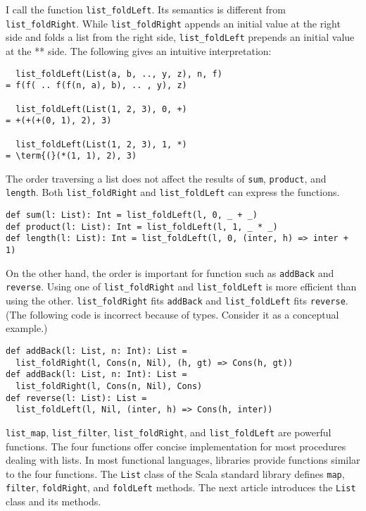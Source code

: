 I call the function \verb!list_foldLeft!. Its semantics is different from
\verb!list_foldRight!. While \verb!list_foldRight! appends an initial value at
the right side and folds a list from the right side, \verb!list_foldLeft!
prepends an initial value at the ** side. The following gives an intuitive
interpretation:

\begin{verbatim}
  list_foldLeft(List(a, b, .., y, z), n, f)
= f(f( .. f(f(n, a), b), .. , y), z)

  list_foldLeft(List(1, 2, 3), 0, +)
= +(+(+(0, 1), 2), 3)

  list_foldLeft(List(1, 2, 3), 1, *)
= \term{(}(*(1, 1), 2), 3)
\end{verbatim}

The order traversing a list does not affect the results of \verb!sum!,
\verb!product!, and \verb!length!. Both \verb!list_foldRight! and
\verb!list_foldLeft! can express the functions.

\begin{verbatim}
def sum(l: List): Int = list_foldLeft(l, 0, _ + _)
def product(l: List): Int = list_foldLeft(l, 1, _ * _)
def length(l: List): Int = list_foldLeft(l, 0, (inter, h) => inter + 1)
\end{verbatim}

On the other hand, the order is important for function such as \verb!addBack! and
\verb!reverse!. Using one of \verb!list_foldRight! and \verb!list_foldLeft! is
more efficient than using the other. \verb!list_foldRight! fits \verb!addBack!
and \verb!list_foldLeft! fits \verb!reverse!. (The following code is incorrect
because of types. Consider it as a conceptual example.)

\begin{verbatim}
def addBack(l: List, n: Int): List =
  list_foldRight(l, Cons(n, Nil), (h, gt) => Cons(h, gt))
def addBack(l: List, n: Int): List =
  list_foldRight(l, Cons(n, Nil), Cons)
def reverse(l: List): List =
  list_foldLeft(l, Nil, (inter, h) => Cons(h, inter))
\end{verbatim}

\verb!list_map!, \verb!list_filter!, \verb!list_foldRight!, and
\verb!list_foldLeft! are powerful functions. The four functions offer concise
implementation for most procedures dealing with lists. In most functional
languages, libraries provide functions similar to the four functions. The
\verb!List! class of the Scala standard library defines \verb!map!,
\verb!filter!, \verb!foldRight!, and \verb!foldLeft! methods. The next article
introduces the \verb!List! class and its methods.

